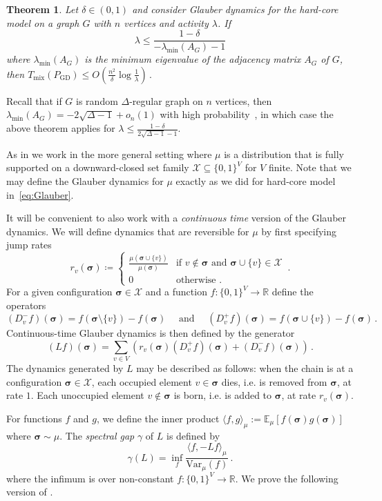 \documentclass[10pt,a4paper]{amsart}
\newtheorem{theorem}{Theorem}[section]
\newcommand{\E}{\mathbb{E}}
\newcommand{\R}{\mathbb{R}}
\newcommand{\sigmabf}{ \boldsymbol{\sigma} }
\newcommand{\rplus}[1]{ r_{#1}(\sigmabf) }
\begin{document}
	\begin{theorem} \label{thm:hard-core-model}
		Let $\delta \in (0,1)$ and consider Glauber dynamics for the hard-core model on a graph $G$ with $n$ vertices and activity $\lambda$.  If $$\lambda \leq \frac{1 - \delta}{-\lambda_{\min}(A_G) - 1}$$
		where $\lambda_{\min}(A_G)$ is the minimum eigenvalue of the adjacency matrix $A_G$ of $G$, then $T_{\mathrm{mix}}(P_{\mathrm{GD}}) \leq O(\frac{n^2}{\delta} \log \frac{1}{\lambda})\,.$
	\end{theorem}
	Recall that if $G$ is random $\Delta$-regular graph on $n$ vertices, then $\lambda_{\min}(A_G)=-2\sqrt{\Delta-1} +o_n(1)$ with high probability~\cite{friedman2008proof}, in which case the above theorem applies for $\lambda\leq \frac{1-\delta}{2\sqrt{\Delta-1}-1}$. 
	
	As in \cite{chen2025rapid} we work in the more general setting where $\mu$ is a distribution that is fully supported on a downward-closed set family $\mathcal{X} \subseteq \{0, 1\}^V$ for $V$ finite. Note that we may define the Glauber dynamics for $\mu$ exactly as we did for hard-core model in~\eqref{eq:Glauber}.
	
	
	It will be convenient to also work with a \emph{continuous time} version of the Glauber dynamics. We will define dynamics that are reversible for $\mu$ by first specifying jump rates  
	$$
	\rplus{v} \coloneqq \begin{cases} \frac{\mu(\sigmabf \cup \{v\})}{\mu(\sigmabf)} & \text{if } v \notin \sigmabf \text{ and } \sigmabf \cup \{v\}  \in \mathcal{X} \\
		0 & \text{otherwise .}
	\end{cases} \,.
	$$
	For a given configuration $\sigmabf\in \mathcal{X}$ and a function $f:\{0,1\}^V \to \R$ define the operators
	$$
	(D^-_vf)(\sigmabf) = f(\sigmabf \setminus \{v\}) - f(\sigmabf) \quad \text{ and }\quad  (D^+_vf)(\sigmabf) = f(\sigmabf \cup \{v\}) - f(\sigmabf) \,.
	$$
	Continuous-time Glauber dynamics is then defined by the generator $$
	(Lf)(\sigmabf) = \sum_{v\in V} \left(r_v(\sigmabf) (D_{v}^+f)(\sigmabf) + (D_{v}^-f)(\sigmabf)\right) \,.
	$$ 
	The dynamics generated by $L$ may be described as follows: 
	when the chain is at a configuration
	$\sigmabf\in\mathcal X$, each occupied element $v\in \sigmabf$ dies, i.e. is removed from
	$\sigmabf$, at rate $1$.  Each unoccupied element $v\notin \sigmabf$ 
	is born, i.e. is added to $\sigmabf$, at rate
	$r_v(\sigmabf)$.
	
	
	For functions $f$ and $g$, we define the inner product $\langle f, g\rangle_\mu := \E_\mu[f(\sigmabf)g(\sigmabf)]$ where $\sigmabf \sim \mu$. The \emph{spectral gap} $\gamma$ of $L$ is defined by \begin{equation}\label{eq:spectral-gap-def}
		\gamma(L) = \inf_{f} \frac{\langle f, -Lf\rangle_\mu}{\text{Var}_\mu(f)}\,.
	\end{equation}
	where the infimum is over non-constant $f:\{0,1\}^V\to\mathbb{R}$.
	We prove the following version of \cite[Theorem~1.9]{chen2025rapid}.  
\end{document}
